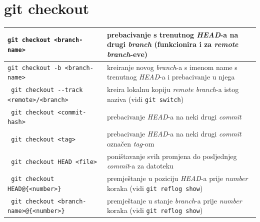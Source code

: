 \documentclass[10pt]{article}
\begin{document}
    \section*{\color{BrickRed} git checkout}
    \begin{tabular}{|>{\tt}p{9.00cm}|>{}p{15.50cm}|}
        \hline
        git checkout <branch-name>                      & prebacivanje s trenutnog \textit{HEAD}-a na drugi \textit{branch} (funkcionira i za \textit{remote branch}-eve) \\ \hline
        git checkout -b <branch-name>                   & kreiranje novog \textit{branch}-a s imenom name s trenutnog \textit{HEAD}-a i prebacivanje u njega \\ \hline
        git checkout -{}-track <remote>/<branch>        & kreira lokalnu kopiju \textit{remote branch}-a istog naziva (vidi \texttt{git switch}) \\ \hline
        git checkout <commit-hash>                      & prebacivanje \textit{HEAD}-a na neki drugi \textit{commit} \\ \hline
        git checkout <tag>                              & prebacivanje \textit{HEAD}-a na neki drugi \textit{commit} označen \textit{tag}-om \\ \hline
        git checkout HEAD <file>                        & poništavanje svih promjena do posljednjeg \textit{commit}-a za datoteku \\ \hline
        git checkout HEAD@\{<number>\}                  & premještanje u poziciju \textit{HEAD}-a prije \textit{number} koraka (vidi \texttt{git reflog show}) \\ \hline
        git checkout <branch-name>@\{<number>\}         & premještanje u stanje \textit{branch}-a prije \textit{number} koraka (vidi \texttt{git reflog show}) \\ \hline
    \end{tabular}
\end{document}
